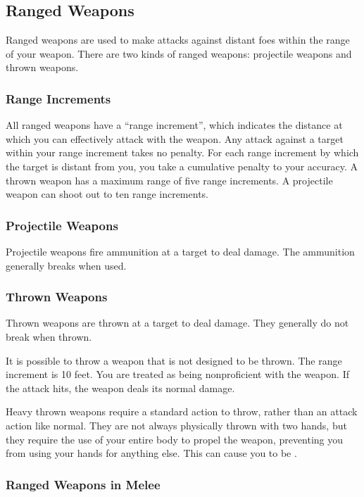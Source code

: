 \subsection{Ranged Weapons}
Ranged weapons are used to make attacks against distant foes within the range of your weapon. There are two kinds of ranged weapons: projectile weapons and thrown weapons.

\subsubsection{Range Increments}\label{Range Increment} All ranged weapons have a ``range increment'', which indicates the distance at which you can effectively attack with the weapon. Any attack against a target within your range increment takes no penalty. For each range increment by which the target is distant from you, you take a cumulative  penalty to your accuracy. A thrown weapon has a maximum range of five range increments. A projectile weapon can shoot out to ten range increments.

\subsubsection{Projectile Weapons} Projectile weapons fire ammunition at a target to deal damage. The ammunition generally breaks when used.

\subsubsection{Thrown Weapons}\label{Thrown Weapons} Thrown weapons are thrown at a target to deal damage. They generally do not break when thrown.

 It is possible to throw a weapon that is not designed to be thrown. The range increment is 10 feet. You are treated as being nonproficient with the weapon. If the attack hits, the weapon deals its normal damage.

 Heavy thrown weapons require a standard action to throw, rather than an attack action like normal. They are not always physically thrown with two hands, but they require the use of your entire body to propel the weapon, preventing you from using your hands for anything else. This can cause you to be .

\subsubsection{Ranged Weapons in Melee}

